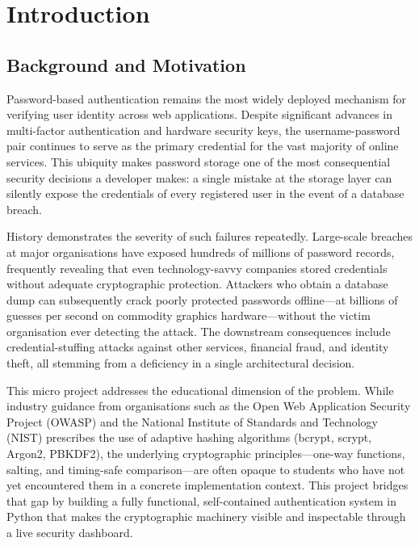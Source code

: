 \chapter{Introduction}
\label{chap:introduction}

\section{Background and Motivation}
\label{sec:intro_background}

Password-based authentication remains the most widely deployed mechanism for verifying user identity across web applications. Despite significant advances in multi-factor authentication and hardware security keys, the username-password pair continues to serve as the primary credential for the vast majority of online services. This ubiquity makes password storage one of the most consequential security decisions a developer makes: a single mistake at the storage layer can silently expose the credentials of every registered user in the event of a database breach.

History demonstrates the severity of such failures repeatedly. Large-scale breaches at major organisations have exposed hundreds of millions of password records, frequently revealing that even technology-savvy companies stored credentials without adequate cryptographic protection. Attackers who obtain a database dump can subsequently crack poorly protected passwords offline---at billions of guesses per second on commodity graphics hardware---without the victim organisation ever detecting the attack. The downstream consequences include credential-stuffing attacks against other services, financial fraud, and identity theft, all stemming from a deficiency in a single architectural decision.

This micro project addresses the educational dimension of the problem. While industry guidance from organisations such as the Open Web Application Security Project (OWASP) \cite{owasp2023} and the National Institute of Standards and Technology (NIST) \cite{nist2022} prescribes the use of adaptive hashing algorithms (bcrypt, scrypt, Argon2, PBKDF2), the underlying cryptographic principles---one-way functions, salting, and timing-safe comparison---are often opaque to students who have not yet encountered them in a concrete implementation context. This project bridges that gap by building a fully functional, self-contained authentication system in Python that makes the cryptographic machinery visible and inspectable through a live security dashboard.

